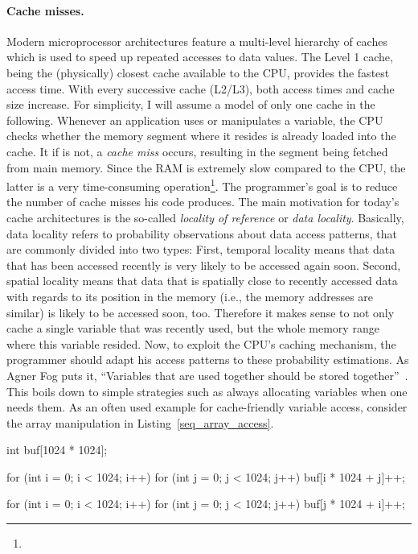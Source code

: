 \paragraph{Cache misses.} Modern microprocessor architectures feature a multi-level hierarchy of caches which is used to speed up repeated accesses to data values. The Level 1 cache, being the (physically) closest cache available to the CPU, provides the fastest access time. With every successive cache (L2/L3), both access times and cache size increase. For simplicity, I will assume a model of only one cache in the following. Whenever an application uses or manipulates a variable, the CPU checks whether the memory segment where it resides is already loaded into the cache. It if is not, a \emph{cache miss} occurs, resulting in the segment being fetched from main memory. Since the RAM is extremely slow compared to the CPU, the latter is a very time-consuming operation\footnote{}. The programmer's goal is to reduce the number of cache misses his code produces. The main motivation for today's cache architectures is the so-called \emph{locality of reference} or \emph{data locality}. Basically, data locality refers to probability observations about data access patterns, that are commonly divided into two types: First, temporal locality means that data that has been accessed recently is very likely to be accessed again soon. Second, spatial locality means that data that is spatially close to recently accessed data with regards to its position in the memory (i.e., the memory addresses are similar) is likely to be accessed soon, too. Therefore it makes sense to not only cache a single variable that was recently used, but the whole memory range where this variable resided. Now, to exploit the CPU's caching mechanism, the programmer should adapt his access patterns to these probability estimations. As Agner Fog puts it, ``Variables that are used together should be stored together''~\cite[p. 88]{fog2011optimizing}. This boils down to simple strategies such as always allocating variables when one needs them. As an often used example for cache-friendly variable access, consider the array manipulation in Listing~\ref{seq_array_access}.
\begin{code}[caption={Sequential vs. non-sequential array access}, label=seq_array_access]
int buf[1024 * 1024];

for (int i = 0; i < 1024; i++)
  for (int j = 0; j < 1024; j++)
    buf[i * 1024 + j]++;

for (int i = 0; i < 1024; i++)
  for (int j = 0; j < 1024; j++)
    buf[j * 1024 + i]++;
\end{code}

